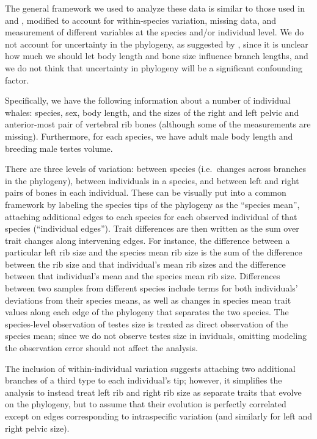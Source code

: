 \documentclass[12pt]{article}
\begin{document}
The general framework we used to analyze these data is similar to those used in \citet{revell2009phylogenetic} and \citet{harmon2008geiger},
modified to account for within-species variation,
missing data,
and measurement of different variables at the species and/or individual level.
We do not account for uncertainty in the phylogeny,
as suggested by \citet{huelsenbeck2003detecting},
since it is unclear how much we should let body length and bone size influence branch lengths,
and we do not think that uncertainty in phylogeny will be a significant confounding factor.

Specifically, we have the following information about a number of individual whales:
species, sex, body length,
and the sizes of the right and left pelvic and anterior-most pair of vertebral rib bones
(although some of the measurements are missing).
Furthermore, for each species, we have
adult male body length and
breeding male testes volume.

There are three levels of variation:
between species (i.e.\ changes across branches in the phylogeny),
between individuals in a species,
and between left and right pairs of bones in each individual.
These can be visually put into a common framework by 
labeling the species tips of the phylogeny as the ``species mean'',
attaching additional edges to each species for each observed individual of that species (``individual edges'').
Trait differences are then written as the sum over trait changes along intervening edges.
For instance, the difference between a particular left rib size and the species mean rib size
is the sum of the difference between the rib size and that individual's mean rib sizes 
and the difference between that individual's mean and the species mean rib size.
Differences between two samples from different species include terms for both individuals' deviations from their species means,
as well as changes in species mean trait values along each edge of the phylogeny that separates the two species.
The species-level observation of testes size is treated as direct observation of the species mean;
since we do not observe testes size in inviduals, omitting modeling the observation error should not affect the analysis.

The inclusion of within-individual variation suggests attaching two additional branches of a third type
to each individual's tip;
however, it simplifies the analysis to instead treat left rib and right rib size 
as separate traits that evolve on the phylogeny,
but to assume that their evolution is perfectly correlated except on edges corresponding to intraspecific variation
(and similarly for left and right pelvic size).
\end{document}
